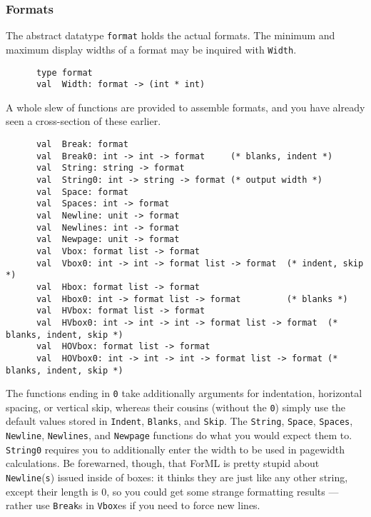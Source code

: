\subsubsection{Formats}
The abstract datatype {\tt format} holds the actual formats. The minimum
and maximum display widths of a format may be inquired with {\tt Width}.
\begin{verbatim}
      type format
      val  Width: format -> (int * int)
\end{verbatim}
A whole slew of functions are provided to assemble formats, and you have already
seen a cross-section of these earlier.
\begin{verbatim}
      val  Break: format
      val  Break0: int -> int -> format     (* blanks, indent *)
      val  String: string -> format
      val  String0: int -> string -> format (* output width *)
      val  Space: format
      val  Spaces: int -> format
      val  Newline: unit -> format
      val  Newlines: int -> format
      val  Newpage: unit -> format
      val  Vbox: format list -> format
      val  Vbox0: int -> int -> format list -> format  (* indent, skip *)
      val  Hbox: format list -> format
      val  Hbox0: int -> format list -> format         (* blanks *)
      val  HVbox: format list -> format
      val  HVbox0: int -> int -> int -> format list -> format  (* blanks, indent, skip *)
      val  HOVbox: format list -> format
      val  HOVbox0: int -> int -> int -> format list -> format (* blanks, indent, skip *)
\end{verbatim}
The functions ending in {\tt 0} take additionally arguments for indentation,
horizontal spacing, or vertical skip, whereas their cousins (without the 
{\tt 0})
simply use the default values stored in {\tt Indent}, {\tt Blanks}, and 
{\tt Skip}. The {\tt String}, {\tt Space}, {\tt Spaces},
{\tt Newline}, {\tt Newlines}, and {\tt Newpage} functions do what you would
expect them to. {\tt String0} requires you to additionally enter the width to
be used in pagewidth calculations.
Be forewarned, though, that ForML is pretty stupid about {\tt Newline}({\tt s})
issued inside of boxes: it thinks they are just like any other string, except
their length is 0, so you could get some strange formatting results --- rather
use {\tt Break}s in {\tt Vbox}es if you need to force new lines.
% 


